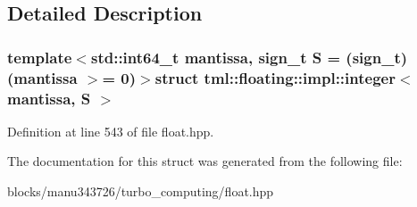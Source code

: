 \subsection{Detailed Description}
\subsubsection*{template$<$std\+::int64\+\_\+t mantissa, sign\+\_\+t S = (sign\+\_\+t)(mantissa $>$= 0)$>$struct tml\+::floating\+::impl\+::integer$<$ mantissa, S $>$}



Definition at line 543 of file float.\+hpp.



The documentation for this struct was generated from the following file\+:\begin{DoxyCompactItemize}
\item 
blocks/manu343726/turbo\+\_\+computing/float.\+hpp\end{DoxyCompactItemize}
